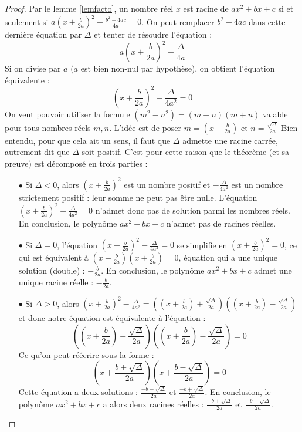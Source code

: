 \documentclass[a4paper,13pt]{scrreprt}
\theoremstyle{plain}
\theoremstyle{definition}
\begin{document}
\begin{proof}
	Par le lemme \ref{lemfacto}, un nombre réel $x$ est racine de $ax^2+bx+c$ si et seulement si $a\left(x+\frac{b}{2a}\right)^2 - \frac{b^2 - 4ac}{4a} = 0$. On peut remplacer $b^2 - 4ac$ dans cette dernière équation par $\Delta$ et tenter de résoudre l'équation :
$$a\left(x+\frac{b}{2a}\right)^2 - \frac{\Delta}{4a}$$
Si on divise par $a$ ($a$ est bien non-nul par hypothèse), on obtient l'équation équivalente :
$$\left(x+\frac{b}{2a}\right)^2 - \frac{\Delta}{4a^2} = 0$$
On veut pouvoir utiliser la formule $(m^2 - n^2) = (m-n)(m+n)$ valable pour tous nombres réels $m,n$. L'idée est de poser $m = (x + \frac{b}{2a})$ et $n = \frac{\sqrt{\Delta}}{2a}$ Bien entendu, pour que cela ait un sens, il faut que $\Delta$ admette une racine carrée, autrement dit que $\Delta$ soit positif. C'est pour cette raison que le théorème (et sa preuve) est décomposé en trois parties : \\
\begin{itemize}
	\item [$\bullet$] Si $\Delta < 0$, alors $(x+\frac{b}{2a})^2$ est un nombre positif et $-\frac{\Delta}{4a^2}$ est un nombre strictement positif : leur somme ne peut pas être nulle. L'équation $(x+\frac{b}{2a})^2-\frac{\Delta}{4a^2}=0$ n'admet donc pas de solution parmi les nombres réels. En conclusion, le polynôme $ax^2 + bx +c$ n'admet pas de racines réelles. \\
	\item [$\bullet$] Si $\Delta = 0$, l'équation $(x+\frac{b}{2a})^2-\frac{\Delta}{4a^2}=0$ se simplifie en $(x+\frac{b}{2a})^2=0$, ce qui est équivalent à $(x+\frac{b}{2a})(x+\frac{b}{2a})=0$, équation qui a une unique solution (double) : $-\frac{b}{2a}$. En conclusion, le polynôme $ax^2 + bx +c$ admet une unique racine réelle : $-\frac{b}{2a}$. \\
\newpage
	\item [$\bullet$] Si $\Delta > 0$, alors $(x+\frac{b}{2a})^2-\frac{\Delta}{4a^2} = ((x+\frac{b}{2a}) + \frac{\sqrt{\Delta}}{2a})((x+\frac{b}{2a}) - \frac{\sqrt{\Delta}}{2a})$ et donc notre équation est équivalente à l'équation : $$\left((x+\frac{b}{2a}) + \frac{\sqrt{\Delta}}{2a}\right) \left((x+\frac{b}{2a}) - \frac{\sqrt{\Delta}}{2a}\right)=0$$ Ce qu'on peut réécrire sous la forme : $$\left(x + \frac{b +\sqrt{\Delta}}{2a}\right) \left(x + \frac{b -\sqrt{\Delta}}{2a}\right)=0$$
	Cette équation a deux solutions : $\frac{-b - \sqrt{\Delta}}{2a}$ et $\frac{-b + \sqrt{\Delta}}{2a}$. En conclusion, le polynôme $ax^2 + bx +c$ a alors deux racines réelles : $\frac{-b + \sqrt{\Delta}}{2a}$ et $\frac{-b - \sqrt{\Delta}}{2a}$.
\end{itemize}
\end{proof}
\end{document}
